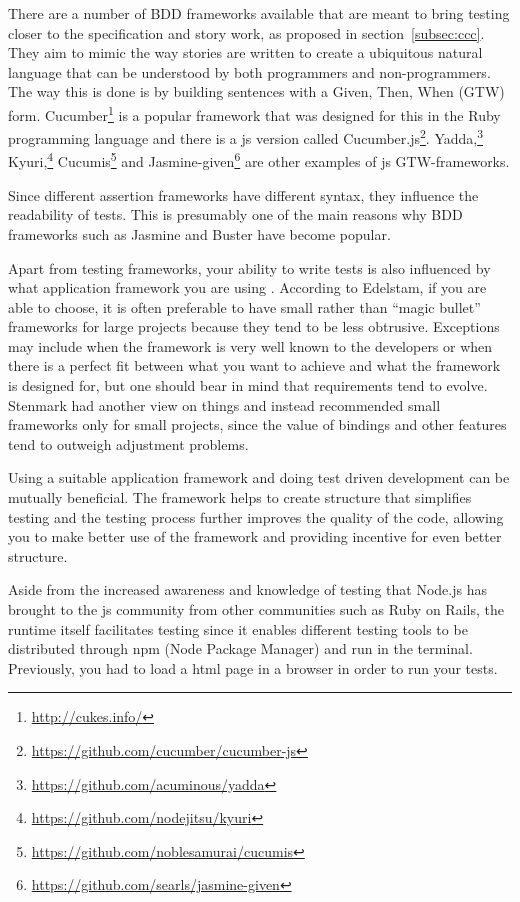 \documentclass[11pt]{article}
\begin{document}
There are a number of BDD frameworks available that are meant to bring testing closer to the specification and story work, as proposed in section~\ref{subsec:ccc}. They aim to mimic the way stories are written to create a ubiquitous natural language that can be understood by both programmers and non-programmers. The way this is done is by building sentences with a Given, Then, When (GTW) form. Cucumber\footnote{\url{http://cukes.info/}} is a popular framework that was designed for this in the Ruby programming language and there is a \gls{js} version called Cucumber.js\footnote{\url{https://github.com/cucumber/cucumber-js}}.
Yadda,\footnote{\url{https://github.com/acuminous/yadda}}
Kyuri,\footnote{\url{https://github.com/nodejitsu/kyuri}}
Cucumis\footnote{\url{https://github.com/noblesamurai/cucumis}} and
Jasmine-given\footnote{\url{https://github.com/searls/jasmine-given}}
are other examples of \gls{js} GTW-frameworks. \cite[section 8.4]{BDDJS}

Since different assertion frameworks have different syntax, they influence the readability of tests. This is presumably one of the main reasons why BDD frameworks such as Jasmine and Buster have become popular. \cite[question~7]{Ahnve}

Apart from testing frameworks, your ability to write tests is also influenced by what application framework you are using \cite[question~8]{Ahnve}. According to Edelstam, if you are able to choose, it is often preferable to have small rather than ``magic bullet'' frameworks for large projects because they tend to be less obtrusive. Exceptions may include when the framework is very well known to the developers or when there is a perfect fit between what you want to achieve and what the framework is designed for, but one should bear in mind that requirements tend to evolve. \cite[questions~48-50]{Edelstam} Stenmark had another view on things and instead recommended small frameworks only for small projects, since the value of bindings and other features tend to outweigh adjustment problems. \cite[questions~12-14]{Stenmark}

Using a suitable application framework and doing test driven development can be mutually beneficial. The framework helps to create structure that simplifies testing and the testing process further improves the quality of the code, allowing you to make better use of the framework and providing incentive for even better structure. \cite[question~15]{Stenmark}

Aside from the increased awareness and knowledge of testing that Node.js has brought to the \gls{js} community from other communities such as Ruby on Rails, the runtime itself facilitates testing since it enables different testing tools to be distributed through npm (Node Package Manager) and run in the terminal. Previously, you had to load a html page in a browser in order to run your tests. \cite[question~9]{Stenmark}
\end{document}
